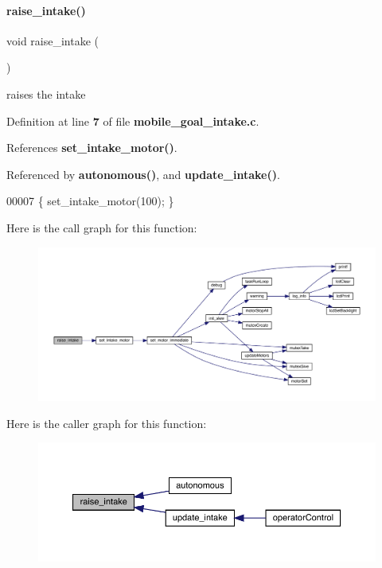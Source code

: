 \paragraph{raise\+\_\+intake()}
{\footnotesize\ttfamily void raise\+\_\+intake (\begin{DoxyParamCaption}{ }\end{DoxyParamCaption})}



raises the intake 



Definition at line \textbf{ 7} of file \textbf{ mobile\+\_\+goal\+\_\+intake.\+c}.



References \textbf{ set\+\_\+intake\+\_\+motor()}.



Referenced by \textbf{ autonomous()}, and \textbf{ update\+\_\+intake()}.


\begin{DoxyCode}
00007 \{ set_intake_motor(100); \}
\end{DoxyCode}
Here is the call graph for this function\+:
\nopagebreak
\begin{figure}[H]
\begin{center}
\leavevmode
\includegraphics[width=350pt]{mobile__goal__intake_8c_aa46a9341d1eb7b39a2ef4cc5079ee3ca_cgraph}
\end{center}
\end{figure}
Here is the caller graph for this function\+:
\nopagebreak
\begin{figure}[H]
\begin{center}
\leavevmode
\includegraphics[width=350pt]{mobile__goal__intake_8c_aa46a9341d1eb7b39a2ef4cc5079ee3ca_icgraph}
\end{center}
\end{figure}
\mbox{\label{mobile__goal__intake_8c_ab31e12bb0fa46c77906a048666b699d5}} 
